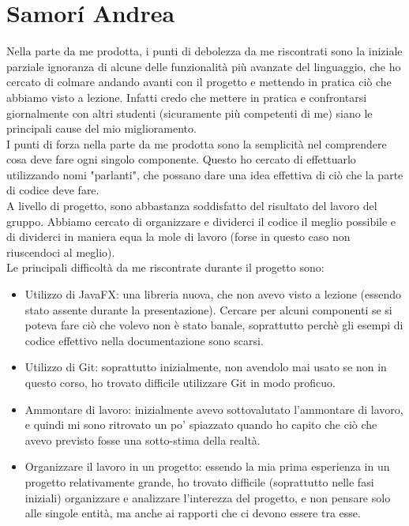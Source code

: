 \documentclass[a4paper,12pt]{report}
\begin{document}
\section{Samor\'i Andrea}
Nella parte da me prodotta, i punti di debolezza da me riscontrati sono la iniziale parziale ignoranza di alcune delle funzionalit\`a pi\`u avanzate del linguaggio, che ho cercato di colmare andando avanti con il progetto e mettendo in pratica ci\`o che abbiamo visto a lezione. Infatti credo che mettere in pratica e confrontarsi giornalmente con altri studenti (sicuramente pi\`u competenti di me) siano le principali cause del mio miglioramento.\\
I punti di forza nella parte da me prodotta sono la semplicit\`a nel comprendere cosa deve fare ogni singolo componente. Questo ho cercato di effettuarlo utilizzando nomi "parlanti", che possano dare una idea effettiva di ci\`o che la parte di codice deve fare.\\
A livello di progetto, sono abbastanza soddisfatto del risultato del lavoro del gruppo. Abbiamo cercato di organizzare e dividerci il codice il meglio possibile e di dividerci in maniera equa la mole di lavoro (forse in questo caso non riuscendoci al meglio). \\
Le principali difficolt\`a da me riscontrate durante il progetto sono:
\begin{itemize}
    \item Utilizzo di JavaFX: una libreria nuova, che non avevo visto a lezione (essendo stato assente durante la presentazione). Cercare per alcuni componenti se si poteva fare ci\`o che volevo non \`e stato banale, soprattutto perch\`e gli esempi di codice effettivo nella documentazione sono scarsi.
    \item Utilizzo di Git: soprattutto inizialmente, non avendolo mai usato se non in questo corso, ho trovato difficile utilizzare Git in modo proficuo.
    \item Ammontare di lavoro: inizialmente avevo sottovalutato l'ammontare di lavoro, e quindi mi sono ritrovato un po' spiazzato quando ho capito che ci\`o che avevo previsto fosse una sotto-stima della realt\`a.
    \item Organizzare il lavoro in un progetto: essendo la mia prima esperienza in un progetto relativamente grande, ho trovato difficile (soprattutto nelle fasi iniziali) organizzare e analizzare l'interezza del progetto, e non pensare solo alle singole entit\`a, ma anche ai rapporti che ci devono essere tra esse.
\end{itemize}
\end{document}
